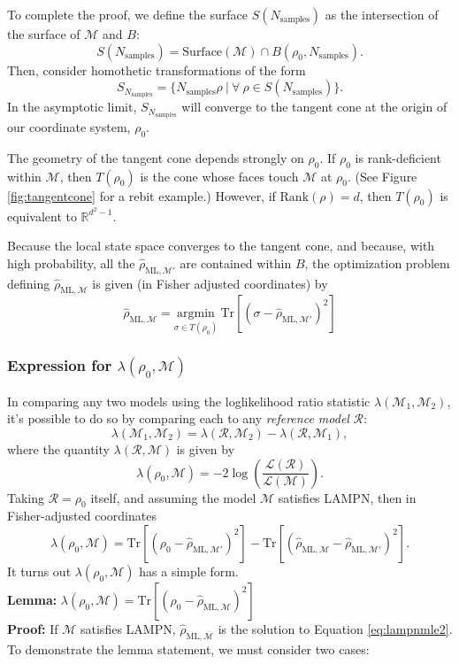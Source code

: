 \documentclass[aps,pra, twocolumn]{revtex4-1}
\newcommand{\M}{\mathcal{M}}
\newcommand{\cL}{\mathcal{L}}
\newcommand{\rhohat}{\hat{\rho}}
\newcommand{\rhoML}[1]{\rhohat_{\scriptscriptstyle{\mathrm{ML},#1}}}
\begin{document}
To complete the proof, we define the surface $S(N_{\mathrm{samples}})$ as the intersection of the surface of $\M$ and $B$:
\[S(N_{\mathrm{samples}}) = \text{Surface}(\M) \cap B(\rho_{0}, N_{\mathrm{samples}}).\]
Then, consider homothetic transformations of the form
\[S_{N_{\mathrm{samples}}} = \{N_{\mathrm{samples}}\rho~|~\forall~\rho \in S(N_{\mathrm{samples}})\}.\]
In the asymptotic limit, $S_{N_{\mathrm{samples}}}$ will converge to the tangent cone at the origin of our coordinate system, $\rho_{0}$.

The geometry of the tangent cone depends strongly on $\rho_{0}$. If $\rho_{0}$ is rank-deficient within $\M$, then $T(\rho_{0})$ is the cone whose faces touch $\M$ at $\rho_{0}$. (See Figure \ref{fig:tangentcone} for a rebit example.) However, if $\mathrm{Rank}(\rho)  = d$, then $T(\rho_{0})$ is equivalent to $\mathbb{R}^{d^{2}-1}$.

Because the local state space converges to the tangent cone, and because, with high probability, all the $\rhoML{\M'}$ are contained within $B$, the optimization problem defining $\rhoML{\M}$ is given (in Fisher adjusted coordinates) by
\begin{equation}
\label{eq:lampnmle2}
\rhoML{\M} = \underset{\sigma \in T(\rho_{0})}{\text{argmin}}~\mathrm{Tr}[(\sigma  -\rhoML{\M'})^{2}]
\end{equation}
\subsubsection{Expression for $\lambda(\rho_{0}, \M)$}

In comparing any two models using the loglikelihood ratio statistic $\lambda(\M_{1}, \M_{2})$, it's possible to do so by comparing each to any \emph{reference model} $\mathcal{R}$: 
\[\lambda(\M_{1}, \M_{2}) = \lambda(\mathcal{R},\M_{2}) - \lambda(\mathcal{R},\M_{1}),\]
where the quantity $\lambda(\mathcal{R}, \M)$ is given by
\[\lambda(\rho_{0}, \M) = -2 \log \left(\frac{\cL(\mathcal{R})}{\cL(\M)}\right).\]
Taking $\mathcal{R} = \rho_{0}$ itself, and assuming the model $\M$ satisfies LAMPN, then in Fisher-adjusted coordinates
\begin{equation}
\label{eq:lambdalan}
\lambda(\rho_{0}, \M) = \mathrm{Tr}[(\rho_{0} - \rhoML{\M'})^{2}] -  \mathrm{Tr}[(\rhoML{\M} - \rhoML{\M'})^{2}].
\end{equation}
It turns out $\lambda(\rho_{0}, \M)$ has a simple form.
~\\
\textbf{Lemma:} $\lambda(\rho_{0}, \M) = \mathrm{Tr}[(\rho_{0} - \rhoML{\M})^{2}]$
~\\
\textbf{Proof:}
If $\M$ satisfies LAMPN, $\rhoML{\M}$ is the solution to Equation \eqref{eq:lampnmle2}. To demonstrate the lemma statement, we must consider two cases:
\end{document}

